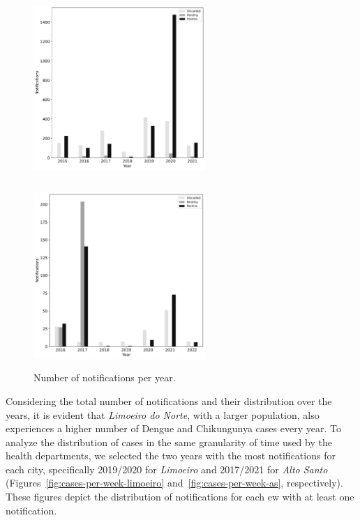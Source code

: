 \begin{center}
	\begin{figure}[ht!]
		\begin{minipage}[c]{.5\textwidth}
			\centering
			\includegraphics[width=6.5cm, height=7cm]{images/cases-per-year-Limoeiro do Norte.pdf}
		\end{minipage}
		\begin{minipage}[c]{.5\textwidth}
			\centering
			\includegraphics[width=6.5cm, height=7cm]{images/cases-per-year-Alto Santo.pdf}
		\end{minipage}
		\caption{\label{fig:cases-per-year} Number of notifications per year.}
	\end{figure}
\end{center}

Considering the total number of notifications and their distribution over the
years, it is evident that \textit{Limoeiro do Norte}, with a larger population,
also experiences a higher number of Dengue and Chikungunya cases every year. To
analyze the distribution of cases in the same granularity of time used by the
health departments, we selected the two years with the most notifications for
each city, specifically 2019/2020 for \textit{Limoeiro} and 2017/2021 for
\textit{Alto Santo} (Figures~\ref{fig:cases-per-week-limoeiro}
and~\ref{fig:cases-per-week-as}, respectively). These figures depict the
distribution of notifications for each \gls{ew} with at least one notification.

